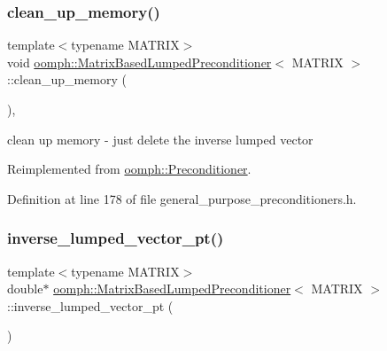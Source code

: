 \subsubsection{\texorpdfstring{clean\+\_\+up\+\_\+memory()}{clean\_up\_memory()}}
{\footnotesize\ttfamily template$<$typename M\+A\+T\+R\+IX$>$ \\
void \hyperlink{classoomph_1_1MatrixBasedLumpedPreconditioner}{oomph\+::\+Matrix\+Based\+Lumped\+Preconditioner}$<$ M\+A\+T\+R\+IX $>$\+::clean\+\_\+up\+\_\+memory (\begin{DoxyParamCaption}{ }\end{DoxyParamCaption})\hspace{0.3cm}{\ttfamily [inline]}, {\ttfamily [virtual]}}



clean up memory -\/ just delete the inverse lumped vector 



Reimplemented from \hyperlink{classoomph_1_1Preconditioner_a46c31c416829bedcd9db238431262027}{oomph\+::\+Preconditioner}.



Definition at line 178 of file general\+\_\+purpose\+\_\+preconditioners.\+h.

\mbox{\label{classoomph_1_1MatrixBasedLumpedPreconditioner_abbfef1f645630a06b5824b0cc69aa3e5}} 
\subsubsection{\texorpdfstring{inverse\+\_\+lumped\+\_\+vector\+\_\+pt()}{inverse\_lumped\_vector\_pt()}}
{\footnotesize\ttfamily template$<$typename M\+A\+T\+R\+IX$>$ \\
double$\ast$ \hyperlink{classoomph_1_1MatrixBasedLumpedPreconditioner}{oomph\+::\+Matrix\+Based\+Lumped\+Preconditioner}$<$ M\+A\+T\+R\+IX $>$\+::inverse\+\_\+lumped\+\_\+vector\+\_\+pt (\begin{DoxyParamCaption}{ }\end{DoxyParamCaption})\hspace{0.3cm}{\ttfamily [inline]}}



